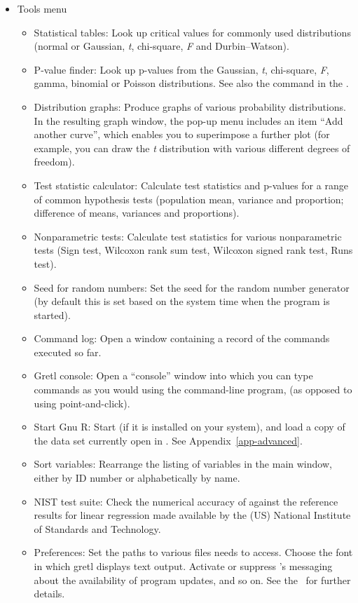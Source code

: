 \begin{itemize}
\item \textsf{Tools menu}
  \begin{itemize}
  \item \textsf{Statistical tables}: Look up critical values for
    commonly used distributions (normal or Gaussian, \emph{t},
    chi-square, \emph{F} and Durbin--Watson).
  \item \textsf{P-value finder}: Look up p-values from the Gaussian,
    \emph{t}, chi-square, \emph{F}, gamma, binomial or Poisson
    distributions. See also the  command in the \GCR.
  \item \textsf{Distribution graphs}: Produce graphs of various
    probability distributions.  In the resulting graph window,
    the pop-up menu includes an item ``Add another curve'', which
    enables you to superimpose a further plot (for example, you
    can draw the \emph{t} distribution with various different degrees
    of freedom).
  \item \textsf{Test statistic calculator}: Calculate test statistics
    and p-values for a range of common hypothesis tests (population
    mean, variance and proportion; difference of means, variances and
    proportions).  
  \item \textsf{Nonparametric tests}: Calculate test statistics
    for various nonparametric tests (Sign test, Wilcoxon rank sum
    test, Wilcoxon signed rank test, Runs test).
  \item \textsf{Seed for random numbers}: Set the seed for the random
    number generator (by default this is set based on the system time
    when the program is started).
  \item \textsf{Command log}: Open a window containing a record
    of the commands executed so far.
  \item \textsf{Gretl console}: Open a ``console'' window into which
    you can type commands as you would using the command-line program,
     (as opposed to using point-and-click).
  \item \textsf{Start Gnu R}: Start  (if it is installed on
    your system), and load a copy of the data set currently open in
    .  See Appendix~\ref{app-advanced}.
  \item \textsf{Sort variables}: Rearrange the listing of variables in
    the main window, either by ID number or alphabetically by name.
  \item \textsf{NIST test suite}: Check the numerical accuracy of
     against the reference results for linear regression
    made available by the (US) National Institute of Standards and
    Technology.
  \item \textsf{Preferences}: Set the paths to various files
     needs to access. Choose the font in which gretl
    displays text output.  Activate or suppress 's
    messaging about the availability of program updates, and so on.
    See the \GCR\ for further details.
  \end{itemize}


\end{itemize}
